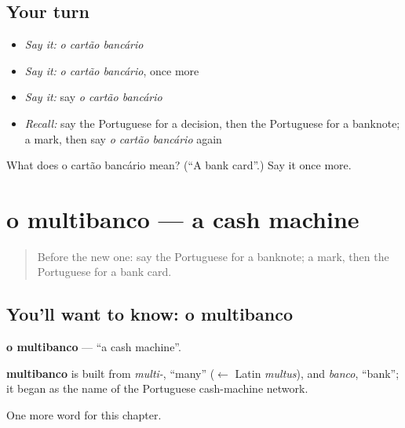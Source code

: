 \subsection*{Your turn}
\begin{itemize}
\raggedright
  \item \emph{Say it:} \emph{o cartão bancário}
  \item \emph{Say it:} \emph{o cartão bancário}, once more
  \item \emph{Say it:} say \emph{o cartão bancário}
  \item \emph{Recall:} say the Portuguese for a decision, then the Portuguese for a banknote; a mark, then say \emph{o cartão bancário} again
\end{itemize}

\begin{tcolorbox}[breakable,colback=teal!4,colframe=teal!35!black,title={Before you move on}]
What does o cartão bancário mean? (\textquotedblleft{}A bank card\textquotedblright{}.) Say it once more.
\end{tcolorbox}
\section[o multibanco]{o multibanco — a cash machine}

\label{lesson:PT-C248-multibanco}



\begin{quote}
Before the new one: say the Portuguese for a banknote; a mark, then the Portuguese for a bank card.
\end{quote}

\subsection*{You'll want to know: o multibanco}
\textbf{o multibanco} — \textquotedblleft{}a cash machine\textquotedblright{}.

\begin{cousinweb}
\textbf{multibanco} is built from \emph{multi-}, \textquotedblleft{}many\textquotedblright{} ($\leftarrow$ Latin \emph{multus}), and \emph{banco}, \textquotedblleft{}bank\textquotedblright{}; it began as the name of the Portuguese cash-machine network.
\end{cousinweb}

\begin{grammarlens}[title={What you've built}]
One more word for this chapter.
\end{grammarlens}

